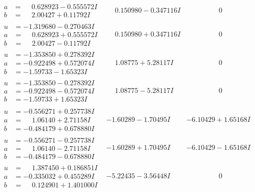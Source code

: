 \documentclass[1p]{elsarticle_modified}
\theoremstyle{definition}
\begin{document}
$$\begin{array}{c|c|c}
\begin{aligned}
a &= \phantom{-}0.628923 - 0.555572 I \\
b &= \phantom{-}2.00427 + 0.11792 I\end{aligned}
 & \phantom{-}0.150980 - 0.347116 I & \phantom{-0.000000 } 0 \\ \hline\begin{aligned}
u &= -1.319680 - 0.270463 I \\
a &= \phantom{-}0.628923 + 0.555572 I \\
b &= \phantom{-}2.00427 - 0.11792 I\end{aligned}
 & \phantom{-}0.150980 + 0.347116 I & \phantom{-0.000000 } 0 \\ \hline\begin{aligned}
u &= -1.353850 + 0.278392 I \\
a &= -0.922498 + 0.572074 I \\
b &= -1.59733 - 1.65323 I\end{aligned}
 & \phantom{-}1.08775 + 5.28117 I & \phantom{-0.000000 } 0 \\ \hline\begin{aligned}
u &= -1.353850 - 0.278392 I \\
a &= -0.922498 - 0.572074 I \\
b &= -1.59733 + 1.65323 I\end{aligned}
 & \phantom{-}1.08775 - 5.28117 I & \phantom{-0.000000 } 0 \\ \hline\begin{aligned}
u &= -0.556271 + 0.257738 I \\
a &= \phantom{-}1.06140 + 2.71158 I \\
b &= -0.484179 + 0.678880 I\end{aligned}
 & -1.60289 - 1.70495 I & -6.10429 + 1.65168 I \\ \hline\begin{aligned}
u &= -0.556271 - 0.257738 I \\
a &= \phantom{-}1.06140 - 2.71158 I \\
b &= -0.484179 - 0.678880 I\end{aligned}
 & -1.60289 + 1.70495 I & -6.10429 - 1.65168 I \\ \hline\begin{aligned}
u &= \phantom{-}1.387450 + 0.186851 I \\
a &= -0.335032 + 0.455289 I \\
b &= \phantom{-}0.124901 + 1.401000 I\end{aligned}
 & -5.22435 - 3.56448 I & \phantom{-0.000000 } 0 \\ \hline\begin{aligned}

\end{aligned}
\end{array}$$
\end{document}

